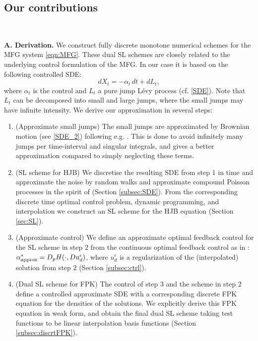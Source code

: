 \documentclass[a4paper,  twoside, 10pt, leqno]{amsart}
\theoremstyle{remark}
\theoremstyle{definition}
\begin{document}
\subsection*{Our contributions}\
\smallskip

{\bf A. Derivation.} We construct fully discrete monotone  numerical schemes for the MFG system \eqref{eqn:MFG}. These dual SL schemes are closely related to the underlying control formulation of the MFG. In our case it is based on the following controlled SDE:
$$dX_t = -\alpha_t \, dt +  dL_t,$$
 where $\alpha_t$ is the control and $L_t$ a pure jump L\'evy process (cf. \eqref{SDE}). Note that $L_t$ can be decomposed into small and large jumps, where the small jumps may have infinite intensity. We derive our approximation in several steps:
\begin{enumerate}[1.]
\item (Approximate small jumps) The small jumps are approximated by Brownian motion (see \eqref{SDE_2}) following 
e.g. \cite{MR1834755,camilli2009finite,karlsen-Elghanjaoui-2002}. This is done to avoid infinitely many jumps per time-interval and
singular integrals, and gives a better approximation compared to simply neglecting these terms.
\smallskip
\item (SL scheme for HJB) We discretise the resulting SDE from step 1 in time  and
approximate the noise by random walks and approximate compound Poisson processes in the spirit of \cite{camilli2009finite} (Section
\ref{subsec:SDE}). From the corresponding discrete
time optimal control problem, dynamic programming, and interpolation we construct an SL scheme for the HJB equation 
(Section \ref{sec:SL}). 
\smallskip
\item (Approximate control) We define an approximate optimal feedback control for the SL scheme in step 2 from the continuous optimal feedback control as in \cite{carliniSilva2014semi1st,carlini2015semi}:  $\alpha^*_{\textup{approx}} =
D_p H(\cdot, Du_d^\epsilon)$, where $u_d^{\epsilon}$ is a regularization
of the (interpolated) solution from step 2  (Section
\ref{subsec:ctrl}). 
\smallskip
 \item (Dual SL scheme for FPK) 
The control of step 3 and the scheme in step 2 define a controlled approximate SDE with a corresponding discrete FPK equation for the densities of the solutions. 
We explicitly derive this FPK equation in weak
form, and obtain the final dual SL scheme taking test functions to be
linear interpolation basis functions (Section \ref{subsec:discrtFPK}). 
\end{enumerate}
\end{document}
